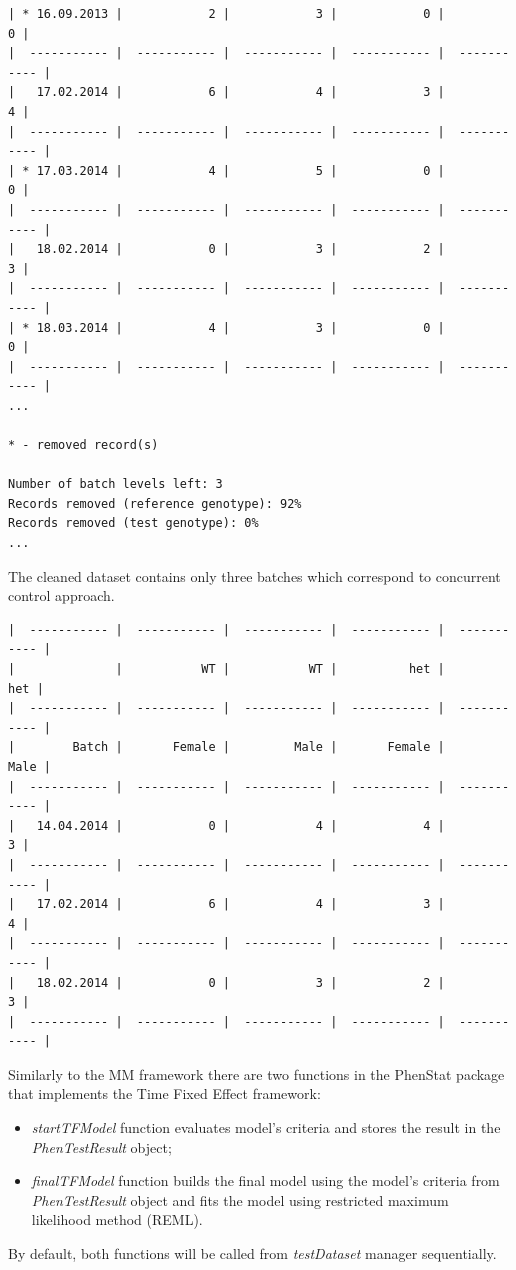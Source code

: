 \documentclass[12pt,a4paper]{article}
\begin{document}
\begin{verbatim}
| * 16.09.2013 |            2 |            3 |            0 |            0 |
|  ----------- |  ----------- |  ----------- |  ----------- |  ----------- |
|   17.02.2014 |            6 |            4 |            3 |            4 |
|  ----------- |  ----------- |  ----------- |  ----------- |  ----------- |
| * 17.03.2014 |            4 |            5 |            0 |            0 |
|  ----------- |  ----------- |  ----------- |  ----------- |  ----------- |
|   18.02.2014 |            0 |            3 |            2 |            3 |
|  ----------- |  ----------- |  ----------- |  ----------- |  ----------- |
| * 18.03.2014 |            4 |            3 |            0 |            0 |
|  ----------- |  ----------- |  ----------- |  ----------- |  ----------- |
...

* - removed record(s)

Number of batch levels left: 3
Records removed (reference genotype): 92%
Records removed (test genotype): 0%
...
\end{verbatim}
\endgroup

The cleaned dataset contains only three batches which correspond to concurrent control approach. 
\begingroup
\fontsize{8pt}{12pt}\selectfont
\begin{verbatim}
|  ----------- |  ----------- |  ----------- |  ----------- |  ----------- |
|              |           WT |           WT |          het |          het |
|  ----------- |  ----------- |  ----------- |  ----------- |  ----------- |
|        Batch |       Female |         Male |       Female |         Male |
|  ----------- |  ----------- |  ----------- |  ----------- |  ----------- |
|   14.04.2014 |            0 |            4 |            4 |            3 |
|  ----------- |  ----------- |  ----------- |  ----------- |  ----------- |
|   17.02.2014 |            6 |            4 |            3 |            4 |
|  ----------- |  ----------- |  ----------- |  ----------- |  ----------- |
|   18.02.2014 |            0 |            3 |            2 |            3 |
|  ----------- |  ----------- |  ----------- |  ----------- |  ----------- |
\end{verbatim}
\endgroup

Similarly to the MM framework there are two functions in the PhenStat package that implements the Time Fixed Effect framework:
\begin{itemize}
\item \textit{startTFModel} function evaluates model's criteria and stores the result in the \textit{PhenTestResult} object;
\item \textit{finalTFModel} function builds the final model using the model's criteria from \textit{PhenTestResult} object and fits the model using restricted maximum likelihood method (REML). 
\end{itemize}
By default, both functions will be called from \textit{testDataset} manager sequentially.
\end{document}
